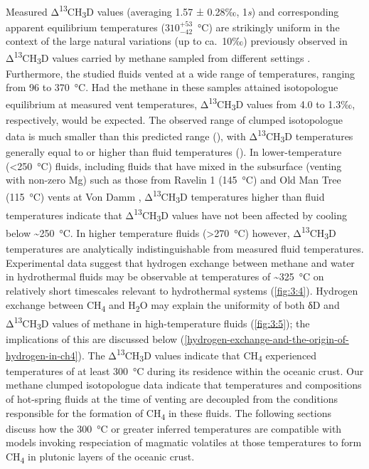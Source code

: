 Measured Δ\textsuperscript{13}CH\textsubscript{3}D values (averaging
1.57 ± 0.28‰, 1\emph{s}) and corresponding apparent equilibrium
temperatures (\(310_{- 42}^{+ 53}\)~°C) are strikingly uniform in the
context of the large natural variations (up to ca.\ 10‰) previously
observed in Δ\textsuperscript{13}CH\textsubscript{3}D values carried by
methane sampled from different settings \parencite{Wang++_2015_S}.
Furthermore, the studied fluids vented at a wide range of temperatures,
ranging from 96 to 370~°C. Had the methane in these samples attained
isotopologue equilibrium at measured vent temperatures,
Δ\textsuperscript{13}CH\textsubscript{3}D values from 4.0 to 1.3‰,
respectively, would be expected. The observed range of clumped
isotopologue data is much smaller than this predicted range (),
with Δ\textsuperscript{13}CH\textsubscript{3}D temperatures generally
equal to or higher than fluid temperatures (). In
lower-temperature (\textless{}250~°C) fluids, including fluids that have
mixed in the subsurface (venting with non-zero Mg) such as those from
Ravelin 1 (145~°C) and Old Man Tree (115~°C) vents at Von Damm
\parencite{McDermott++_2015_PNAS}, Δ\textsuperscript{13}CH\textsubscript{3}D
temperatures higher than fluid temperatures indicate that
Δ\textsuperscript{13}CH\textsubscript{3}D values have not been affected
by cooling below \textasciitilde{}250~°C. In higher temperature fluids
(\textgreater{}270~°C) however,
Δ\textsuperscript{13}CH\textsubscript{3}D temperatures are analytically
indistinguishable from measured fluid temperatures. Experimental data
suggest that hydrogen exchange between methane and water in hydrothermal
fluids may be observable at temperatures of \textasciitilde{}325~°C on
relatively short timescales \parencite[years;][and \autoref{fig:3:S2}]{Reeves++_2012_GCA}
relevant to hydrothermal systems (\autoref{fig:3:4}). Hydrogen exchange between
CH\textsubscript{4} and H\textsubscript{2}O may explain the uniformity
of both δD and Δ\textsuperscript{13}CH\textsubscript{3}D values of
methane in high-temperature fluids (\autoref{fig:3:5}); the implications of this
are discussed below (\autoref{hydrogen-exchange-and-the-origin-of-hydrogen-in-ch4}). The
Δ\textsuperscript{13}CH\textsubscript{3}D values indicate that
CH\textsubscript{4} experienced temperatures of at least 300~°C during
its residence within the oceanic crust. Our methane clumped isotopologue
data indicate that temperatures and compositions of hot-spring fluids at
the time of venting are decoupled from the conditions responsible for
the formation of CH\textsubscript{4} in these fluids. The following
sections discuss how the 300~°C or greater inferred temperatures are
compatible with models invoking respeciation of magmatic volatiles at
those temperatures to form CH\textsubscript{4} in plutonic layers of the
oceanic crust.

